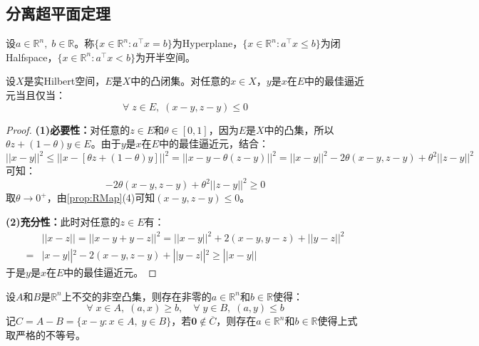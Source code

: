 \subsection{分离超平面定理}
\begin{definition}
	设$a\in\mathbb{R}^{n},\;b\in\mathbb{R}$。称$\{x\in\mathbb{R}^{n}:a^{\top}x=b\}$为\gls{Hyperplane}，$\{x\in\mathbb{R}^{n}:a^{\top}x\leqslant b\}$为闭\gls{Halfspace}，$\{x\in\mathbb{R}^{n}:a^{\top}x< b\}$为开半空间。
\end{definition}
\begin{lemma}\label{lem:BestApproximationElement}
	设$X$是实Hilbert空间，$E$是$X$中的凸闭集。对任意的$x\in X$，$y$是$x$在$E$中的最佳逼近元当且仅当：
	\begin{equation*}
		\forall\;z\in E,\;(x-y,z-y)\leqslant0
	\end{equation*}
\end{lemma}
\begin{proof}
	\textbf{(1)必要性：}对任意的$z\in E$和$\theta\in[0,1]$，因为$E$是$X$中的凸集，所以$\theta z+(1-\theta)y\in E$。由于$y$是$x$在$E$中的最佳逼近元，结合：
	\begin{equation*}
		||x-y||^2\leqslant||x-[\theta z+(1-\theta)y]||^2=||x-y-\theta(z-y)||^2=||x-y||^2-2\theta(x-y,z-y)+\theta^2||z-y||^2
	\end{equation*}
	可知：
	\begin{equation*}
		-2\theta(x-y,z-y)+\theta^2||z-y||^2\geqslant0
	\end{equation*}
	取$\theta\to0^+$，由\cref{prop:RMap}(4)可知$(x-y,z-y)\leqslant0$。\par
	\textbf{(2)充分性：}此时对任意的$z\in E$有：
	\begin{align*}
		&||x-z||=||x-y+y-z||^2=||x-y||^2+2(x-y,y-z)+||y-z||^2 \\
		=&|x-y||^2-2(x-y,z-y)+||y-z||^2\geqslant||x-y||
	\end{align*}
	于是$y$是$x$在$E$中的最佳逼近元。
\end{proof}
\begin{theorem}\label{theo:HyperplaneSeparationTheorem}
	设$A$和$B$是$\mathbb{R}^{n}$上不交的非空凸集，则存在非零的$a\in\mathbb{R}^{n}$和$b\in\mathbb{R}$使得：
	\begin{equation*}
		\forall\;x\in A,\;(a,x)\geqslant b,\quad\forall\;y\in B,\;(a,y)\leqslant b
	\end{equation*}
	记$C=A-B=\{x-y:x\in A,\;y\in B\}$，若$\mathbf{0}\notin\overline{C}$，则存在$a\in\mathbb{R}^{n}$和$b\in\mathbb{R}$使得上式取严格的不等号。
\end{theorem}
